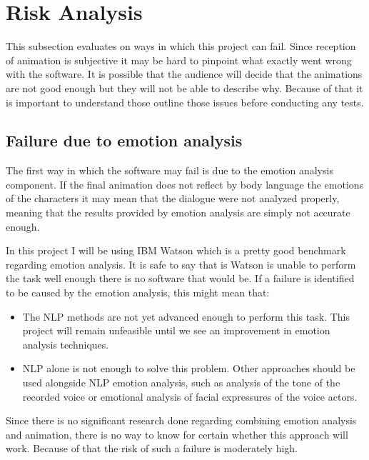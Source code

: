 \section{Risk Analysis}
\label{sec:riskanal}

This subsection evaluates on ways in which this project can fail. Since reception of animation is subjective it may be hard to pinpoint what exactly went wrong with the software. It is possible that the audience will decide that the animations are not good enough but they will not be able to describe why. Because of that it is important to understand those outline those issues before conducting any tests.

\bigskip
\subsection{Failure due to emotion analysis}
The first way in which the software may fail is due to the emotion analysis component. If the final animation does not reflect by body language the emotions of the characters it may mean that the dialogue were not analyzed properly, meaning that the results provided by emotion analysis are simply not accurate enough.

In this project I will be using IBM Watson which is a pretty good benchmark regarding emotion analysis. It is safe to say that is Watson is unable to perform the task well enough there is no software that would be. If a failure is identified to be caused by the emotion analysis, this might mean that:
\begin{itemize}
\item The NLP methods are not yet advanced enough to perform this task. This project will remain unfeasible until we see an improvement in emotion analysis techniques.
\item NLP alone is not enough to solve this problem. Other approaches should be used alongside NLP emotion analysis, such as analysis of the tone of the recorded voice or emotional analysis of facial expressures of the voice actors.
\end{itemize}

Since there is no significant research done regarding combining emotion analysis and animation, there is no way to know for certain whether this approach will work. Because of that the risk of such a failure is moderately high.


\bigskip
